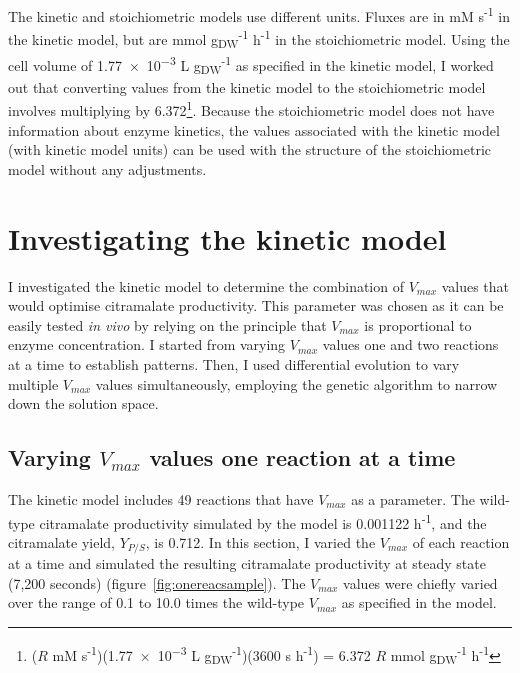 \documentclass[parskip=full, numbers=noenddot]{scrreprt}
\begin{document}
The kinetic and stoichiometric models use different units. Fluxes are in mM s\textsuperscript{-1} in the kinetic model, but are mmol g\textsubscript{DW}\textsuperscript{-1} h\textsuperscript{-1} in the stoichiometric model. Using the cell volume of \num{1.77e-3} L g\textsubscript{DW}\textsuperscript{-1} as specified in the kinetic model, I worked out that converting values from the kinetic model to the stoichiometric model involves multiplying by 6.372\footnote{
($R$ mM s\textsuperscript{-1})(\num{1.77e-3} L g\textsubscript{DW}\textsuperscript{-1})(3600 s h\textsuperscript{-1}) = 6.372 $R$ mmol g\textsubscript{DW}\textsuperscript{-1} h\textsuperscript{-1}
}.
Because the stoichiometric model does not have information about enzyme kinetics, the values associated with the kinetic model (with kinetic model units) can be used with the structure of the stoichiometric model without any adjustments.

\chapter{Investigating the kinetic model}
\label{ch:kinetic}

I investigated the kinetic model to determine the combination of $V_{max}$ values that would optimise citramalate productivity. This parameter was chosen as it can be easily tested \emph{in vivo} by relying on the principle that $V_{max}$ is proportional to enzyme concentration. I started from varying $V_{max}$ values one and two reactions at a time to establish patterns. Then, I used differential evolution to vary multiple $V_{max}$ values simultaneously, employing the genetic algorithm to narrow down the solution space.

\section{Varying $V_{max}$ values one reaction at a time}
\label{sec:onereac}

The kinetic model includes 49 reactions that have $V_{max}$ as a parameter.
The wild-type citramalate productivity simulated by the model is 0.001122 h\textsuperscript{-1}, and
the citramalate yield, $Y_{P/S}$, is 0.712.
In this section, I varied the $V_{max}$ of each reaction at a time and simulated the resulting citramalate productivity at steady state (7,200 seconds) (figure~\ref{fig:onereacsample}). The $V_{max}$ values were chiefly varied over the range of 0.1 to 10.0 times the wild-type $V_{max}$ as specified in the model.
\end{document}
